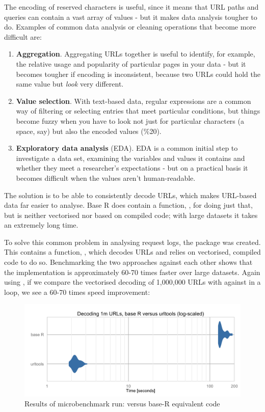 The encoding of reserved characters is useful, since it means that URL
paths and queries can contain a vast array of values - but it makes data
analysis tougher to do. Examples of common data analysis or cleaning
operations that become more difficult are:

\begin{enumerate}
\def\labelenumi{\arabic{enumi}.}
\tightlist
\item
  \textbf{Aggregation}. Aggregating URLs together is useful to identify,
  for example, the relative usage and popularity of particular pages in
  your data - but it becomes tougher if encoding is inconsistent,
  because two URLs could hold the same value but \emph{look} very
  different.
\item
  \textbf{Value selection}. With text-based data, regular expressions
  are a common way of filtering or selecting entries that meet
  particular conditions, but things become fuzzy when you have to look
  not just for particular characters (a space, say) but also the encoded
  values (\%20).
\item
  \textbf{Exploratory data analysis} (EDA). EDA is a common initial step
  to investigate a data set, examining the variables and values it
  contains and whether they meet a researcher's expectations - but on a
  practical basis it becomes difficult when the values aren't
  human-readable.
\end{enumerate}

The solution is to be able to consistently decode URLs, which makes
URL-based data far easier to analyse. Base R does contain a function,
, for doing just that, but is neither vectorised nor
based on compiled code; with large datasets it takes an extremely long
time.

To solve this common problem in analysing request logs,
the \citep{urltools} package was created. This
contains a function, , which decodes URLs and relies
on vectorised, compiled code to do so. Benchmarking the two approaches
against each other shows that the  implementation is
approximately 60-70 times faster over large datasets. Again using
, if we compare the vectorised decoding of 1,000,000
URLs with  against  in a 
loop, we see a 60-70 times speed improvement:

\begin{figure}[h]
    \centering
    \includegraphics[width=14cm,keepaspectratio]{decoding_benchmarks-jay}
    \caption{Results of microbenchmark run:  versus base-R equivalent code}
\end{figure}

